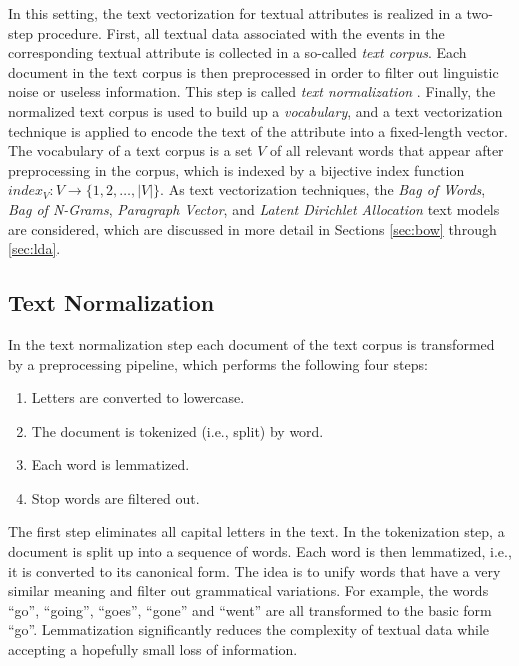 In this setting, the text vectorization for textual attributes is realized in a two-step procedure.
First, all textual data associated with the events in the corresponding textual attribute is collected in a so-called \textit{text corpus}.
Each document in the text corpus is then preprocessed in order to filter out linguistic noise or useless information.
This step is called \textit{text normalization}  \cite{DBLP:books/lib/JurafskyM09}.
Finally, the normalized text corpus is used to build up a \textit{vocabulary}, and a text vectorization technique is applied to encode the text of the attribute into a fixed-length vector.
The vocabulary of a text corpus is a set $V$ of all relevant words that appear after preprocessing in the corpus, which is indexed by a bijective index function $index_V \colon V \to \{1, 2, \dots, |V|\}$.
As text vectorization techniques, the \textit{Bag of Words}, \textit{Bag of N-Grams}, \textit{Paragraph Vector}, and \textit{Latent Dirichlet Allocation} text models are considered, which are discussed in more detail in Sections \ref{sec:bow} through \ref{sec:lda}.

\subsection{Text Normalization}

In the text normalization step each document of the text corpus is transformed by a preprocessing pipeline, which performs the following four steps:
\begin{enumerate} 
	\item Letters are converted to lowercase.
	\item The document is tokenized (i.e., split) by word.
	\item Each word is lemmatized.
	\item Stop words are filtered out.
\end{enumerate}
The first step eliminates all capital letters in the text.
In the tokenization step, a document is split up into a sequence of words.
Each word is then lemmatized, i.e., it is converted to its canonical form.
The idea is to unify words that have a very similar meaning and filter out grammatical variations.
For example, the words   \enquote{go}, \enquote{going}, \enquote{goes}, \enquote{gone} and   \enquote{went} are all transformed to the basic form   \enquote{go}.
Lemmatization significantly reduces the complexity of textual data while accepting a hopefully small loss of information.

